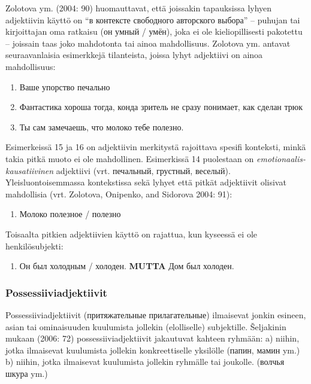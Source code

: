 \documentclass[]{scrartcl}
\providecommand{\tightlist}{%
  \setlength{\itemsep}{0pt}\setlength{\parskip}{0pt}}
\begin{document}
Zolotova ym. (2004: 90) huomauttavat, että joissakin tapauksissa lyhyen
adjektiivin käyttö on ``в контексте свободного авторского выбора'' --
puhujan tai kirjoittajan oma ratkaisu (он умный / умён), joka ei ole
kieliopillisesti pakotettu -- joissain taas joko mahdotonta tai ainoa
mahdollisuus. Zolotova ym. antavat seuraavanlaisia esimerkkejä
tilanteista, joissa lyhyt adjektiivi on ainoa mahdollisuus:

\begin{enumerate}
\def\labelenumi{(\arabic{enumi})}
\setcounter{enumi}{13}
\tightlist
\item
  Ваше упорство печально
\item
  Фантастика хороша тогда, конда зритель не сразу понимает, как сделан
  трюк
\item
  Ты сам замечаешь, что молоко тебе полезно.
\end{enumerate}

Esimerkeissä 15 ja 16 on adjektiivin merkitystä rajoittava spesifi
konteksti, minkä takia pitkä muoto ei ole mahdollinen. Esimerkissä 14
puolestaan on \emph{emotionaalis-kausatiivinen} adjektiivi (vrt.
печальный, грустный, веселый). Yleisluontoisemmassa kontekstissa sekä
lyhyet että pitkät adjektiivit olisivat mahdollisia (vrt. Zolotova,
Onipenko, and Sidorova 2004: 91):

\begin{enumerate}
\def\labelenumi{(\arabic{enumi})}
\setcounter{enumi}{16}
\tightlist
\item
  Молоко полезное / полезно
\end{enumerate}

Toisaalta pitkien adjektiivien käyttö on rajattua, kun kyseessä ei ole
henkilösubjekti:

\begin{enumerate}
\def\labelenumi{(\arabic{enumi})}
\setcounter{enumi}{17}
\tightlist
\item
  Он был холодным / холоден. \textbf{MUTTA} Дом был холоден.
\end{enumerate}

\subsubsection{Possessiiviadjektiivit}\label{possessiiviadjektiivit}

Possessiiviadjektiivit (притяжательные прилагательные) ilmaisevat jonkin
esineen, asian tai ominaisuuden kuulumista jollekin (elolliselle)
subjektille. Šeljakinin mukaan (2006: 72) possessiiviadjektiivit
jakautuvat kahteen ryhmään: a) niihin, jotka ilmaisevat kuulumista
jollekin konkreettiselle yksilölle (папин, мамин ym.) b) niihin, jotka
ilmaisevat kuulumista jollekin ryhmälle tai joukolle. (волчья шкура ym.)
\end{document}
